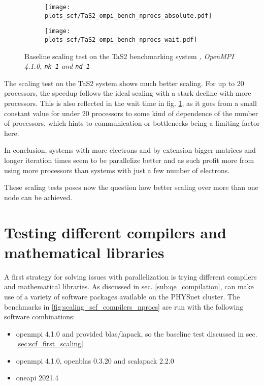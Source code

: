 \documentclass[main.tex]{subfiles}
\begin{document}
\begin{figure}[ht!]
\begin{subfigure}[b]{0.49\textwidth}
    \centering
    \texttt{[image: plots\_scf/TaS2\_ompi\_bench\_nprocs\_absolute.pdf]}
\end{subfigure}
\begin{subfigure}[b]{0.49\textwidth}
    \centering
    \texttt{[image: plots\_scf/TaS2\_ompi\_bench\_nprocs\_wait.pdf]}
\end{subfigure}
\caption{Baseline scaling test on the TaS2 benchmarking system \emph{, OpenMPI 4.1.0, \texttt{nk 1} and \texttt{nd 1}}}
\label{fig:scaling_scf_ompi_nprocs_tas2_absolute_wait}
\end{figure}
The scaling test on the TaS2 system shows much better scaling.
For up to 20 processors, the speedup follows the ideal scaling with a stark decline with more processors.
This is also reflected in the wait time in fig. \ref{fig:scaling_scf_ompi_nprocs_tas2_absolute_wait}, as it goes from a small constant value for under 20 processors to some kind of dependence of the number of processors, which hints to communication or bottlenecks being a limiting factor here.

In conclusion, systems with more electrons and by extension bigger matrices and longer iteration times seem to be parallelize better and as such profit more from using more processors than systems with just a few number of electrons.

These scaling tests poses now the question how better scaling over more than one node can be achieved.

\section{Testing different compilers and mathematical libraries}\label{sec:scf_scaling_compilers}

A first strategy for solving issues with parallelization is trying different compilers and mathematical libraries.
As discussed in sec. \ref{sub:qe_compilation}, \QE can make use of a variety of software packages available on the PHYSnet cluster.
The benchmarks in \ref{fig:scaling_scf_compilers_nprocs} are run with the following software combinations:
\begin{itemize}
    \item \gls{openmpi} 4.1.0 and \QE provided \gls{blas}/\gls{lapack}, so the baseline test discussed in sec. \ref{sec:scf_first_scaling}
    \item \gls{openmpi} 4.1.0, \gls{openblas} 0.3.20 and \gls{scalapack} 2.2.0
    \item \gls{oneapi} 2021.4
\end{itemize}
\end{document}
